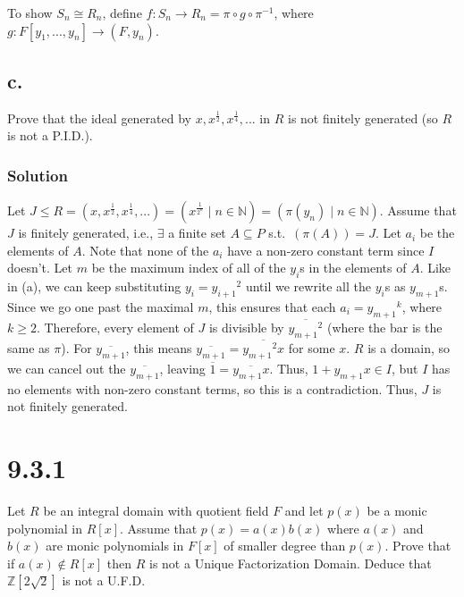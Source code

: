 \documentclass[fleqn]{article}
\begin{document}
            To show $S_n \cong R_n$, define $f: S_n \to R_n = \pi \circ g \circ \pi^{-1}$, where $g: F[y_1, ..., y_n] \to (F, y_n)$.
        
        \subsection{c.}
        Prove that the ideal generated by $x, x^\frac{1}{2}, x^\frac{1}{4}, ...$ in $R$ is not finitely generated (so $R$ is not a P.I.D.).
            
            \subsubsection{Solution}
            Let $J \leq R = \left(x, x^\frac{1}{2}, x^\frac{1}{4}, ...\right) = \left(x^\frac{1}{2^n} \mid n \in \mathbb{N}\right) = (\pi(y_n) \mid n \in \mathbb{N})$.  Assume that $J$ is finitely generated, i.e., $\exists$ a finite set $A \subseteq P$ s.t.\ $(\pi(A)) = J$.  Let $a_i$ be the elements of $A$.  Note that none of the $a_i$ have a non-zero constant term since $I$ doesn't.
            Let $m$ be the maximum index of all of the $y_i$s in the elements of $A$.  Like in (a), we can keep substituting $y_i = {y_{i + 1}}^2$ until we rewrite all the $y_i$s as $y_{m + 1}$s.  Since we go one past the maximal $m$, this ensures that each $a_i = {y_{m + 1}}^k$, where $k \geq 2$.  Therefore, every element of $J$ is divisible by $\overline{{y_{m + 1}}^2}$ (where the bar is the same as $\pi$).  For $\overline{y_{m + 1}}$, this means $\overline{y_{m + 1}} = \overline{{y_{m + 1}}^2 x}$ for some $x$.  $R$ is a domain, so we can cancel out the $\overline{y_{m + 1}}$, leaving $\overline{1} = \overline{y_{m + 1} x}$.  Thus, $1 + y_{m + 1} x \in I$, but $I$ has no elements with non-zero constant terms, so this is a contradiction.  Thus, $J$ is not finitely generated.
    
    \section{9.3.1}
    Let $R$ be an integral domain with quotient field $F$ and let $p(x)$ be a monic polynomial in $R[x]$.  Assume that $p(x) = a(x)b(x)$ where $a(x)$ and $b(x)$ are monic polynomials in $F[x]$ of smaller degree than $p(x)$.  Prove that if $a(x) \notin R[x]$ then $R$ is not a Unique Factorization Domain.  Deduce that $\mathbb{Z}[2\sqrt{2}]$ is not a U.F.D.
        
\end{document}
